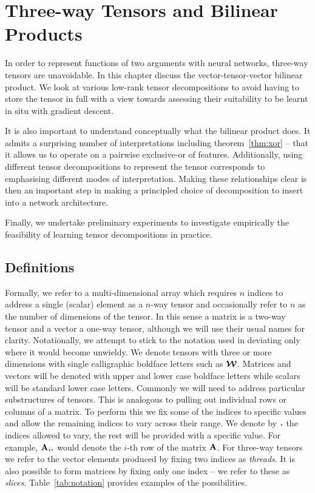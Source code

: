 
\chapter{Three-way Tensors and Bilinear Products}\label{C:tens}

In order to represent functions of two arguments with neural networks, three-way tensors are 
unavoidable. In this chapter discuss the vector-tensor-vector bilinear product. We look at various
low-rank tensor decompositions to avoid having to store the tensor in full with a view towards
assessing their suitability to be learnt in situ with gradient descent.

It is also important to understand conceptually what the bilinear product does. It admits a surprising
number of interpretations including theorem~\ref{thm:xor} -- that it allows us to operate on a
pairwise exclusive-or of features. Additionally, using different tensor decompositions to represent
the tensor corresponds to emphasising different modes of interpretation. Making these relationships
clear is then an important step in making a principled choice of decomposition to insert into a 
network architecture.

Finally, we undertake preliminary experiments to investigate empirically the feasibility of learning
tensor decompositions in practice.

\section{Definitions}
Formally, we refer to a multi-dimensional array which requires \(n\) indices to address a single
(scalar) element as a \(n\)-way tensor and occasionally refer to \(n\) as the number of dimensions of
the tensor. In this sense a matrix is a two-way tensor and a vector
a one-way tensor, although we will use their usual names for clarity. Notationally, we attempt to
stick to the notation used in \autocite{Kolda2009} deviating only where it would become unwieldy.
We denote tensors with three or more dimensions with single calligraphic boldface letters such
as \(\bm{\mathcal{W}}\). Matrices and vectors will be denoted with upper and lower case boldface letters
while scalars will be standard lower case letters. Commonly we will need to address particular
substructures of tensors. This is analogous to pulling out individual rows or columns of a matrix.
To perform this we fix some of the indices to specific values and allow the remaining indices to vary
across their range. We denote by \(\midbullet\) the indices allowed to vary, the rest will be provided
with a specific value. For example, \(\mat{A}_{i \midbullet}\) would denote the \(i\)-th row of the
matrix \(\mathbf{A}\).
For three-way tensors we refer to the vector elements produced by fixing two indices as 
\emph{threads}. It is also possible to form matrices by fixing only one index -- we refer to these
as \emph{slices}. Table~\ref{tab:notation} provides examples of the possibilities.


